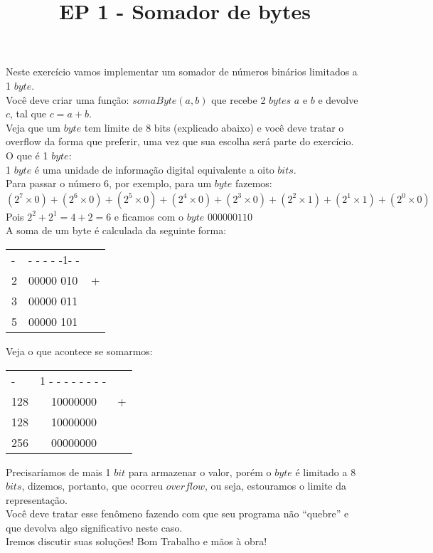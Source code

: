 \documentclass{article}
\title{EP 1 - Somador de bytes}
\date{}
\begin{document}
	\maketitle
	Neste exercício vamos implementar um somador de números binários limitados a 1 $byte$.\\
	Você deve criar uma função: $somaByte(a, b)$ que recebe 2 $bytes$
	$a$ e $b$ e devolve $c$, tal que $c = a + b$.\\ Veja que um $byte$ tem limite de 8 bits 
	(explicado abaixo) e você deve tratar o overflow da forma que preferir, uma vez que
	sua escolha será parte do exercício.\\
	\center
	O que é 1 $byte$:\\
		1 $byte$ é uma unidade de informação digital equivalente a oito $bits$.\\
		Para passar o número 6, por exemplo, para um $byte$ fazemos:
		 $$(2^7\times 0) + (2^6\times 0) + (2^5\times 0) + (2^4\times 0) + (2^3\times 0) + (2^2\times 1) + (2^1\times 1) + (2^0\times 0)$$
		 Pois $2^2 + 2^1 = 4 + 2 = 6$ e ficamos com o $byte$ $000000110$\\
		 \hfill
		\newline
		\hfill
		\newline		 
		\hfill
		\newline
		 A soma de um byte é calculada da seguinte forma:
		\begin{table}[h]
			\center
			\begin{tabular}{lll}
				- & - - - - -1- - &   \\
				2 & 00000 010       & + \\ 
				3 & 00000 011       &   \\ \cline{1-2}
				5 & 00000 101       &  
			\end{tabular}
		\end{table}
		\newline
		Veja o que acontece se somarmos:
		\begin{table}[h]
			\center
			\begin{tabular}{lll}
				- & 1  - - - - - - - - &   \\
				 128 &  \ \ 10000000       & + \\ 
				128 &   \  \ 10000000       &   \\ \cline{1-2}
				256 &   \ \ 00000000       &  
			\end{tabular}
		\end{table}
		\newline
		Precisaríamos de mais 1 $bit$ para armazenar o valor, porém o $byte$ é limitado a 8 $bits$, dizemos, portanto,
		que ocorreu $overflow$, ou seja, estouramos o limite da representação.\\
		Você deve tratar esse fenômeno fazendo com que seu programa não ``quebre'' e que devolva algo significativo
		neste caso.\\
		\center
			Iremos discutir suas soluções! Bom Trabalho e mãos à obra!
		
		
		
	
\end{document}

